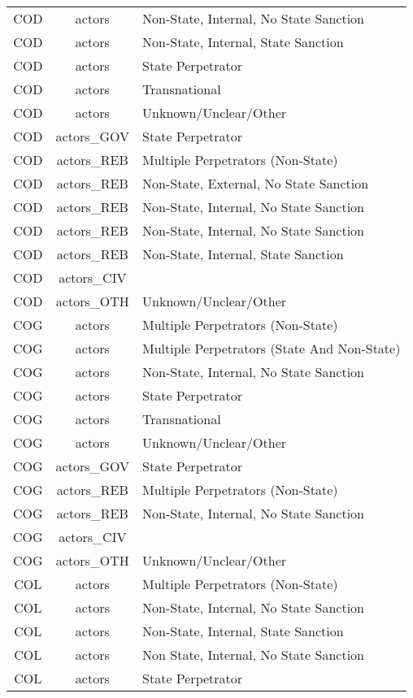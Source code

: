 \documentclass[12pt]{article}
\begin{document}
\begin{center}
\begin{longtable}{|c|c|p{10cm}|}
  COD & actors & Non-State, Internal, No State Sanction \\ 
  COD & actors & Non-State, Internal, State Sanction \\ 
  COD & actors & State Perpetrator \\ 
  COD & actors & Transnational \\ 
  COD & actors & Unknown/Unclear/Other \\ 
  COD & actors\_GOV & State Perpetrator \\ 
  COD & actors\_REB & Multiple Perpetrators (Non-State) \\ 
  COD & actors\_REB & Non-State, External, No State Sanction \\ 
  COD & actors\_REB & Non-State, Internal, No State Sanction \\ 
  COD & actors\_REB & Non-State, Internal, No State Sanction \\ 
  COD & actors\_REB & Non-State, Internal, State Sanction \\ 
  COD & actors\_CIV &  \\ 
  COD & actors\_OTH & Unknown/Unclear/Other \\ 
  COG & actors & Multiple Perpetrators (Non-State) \\ 
  COG & actors & Multiple Perpetrators (State And Non-State) \\ 
  COG & actors & Non-State, Internal, No State Sanction \\ 
  COG & actors & State Perpetrator \\ 
  COG & actors & Transnational \\ 
  COG & actors & Unknown/Unclear/Other \\ 
  COG & actors\_GOV & State Perpetrator \\ 
  COG & actors\_REB & Multiple Perpetrators (Non-State) \\ 
  COG & actors\_REB & Non-State, Internal, No State Sanction \\ 
  COG & actors\_CIV &  \\ 
  COG & actors\_OTH & Unknown/Unclear/Other \\ 
  COL & actors & Multiple Perpetrators (Non-State) \\ 
  COL & actors & Non-State, Internal, No State Sanction \\ 
  COL & actors & Non-State, Internal, State Sanction \\ 
  COL & actors & Non State, Internal, No State Sanction \\ 
  COL & actors & State Perpetrator \\ 

\end{longtable}
\end{center}
\end{document}
